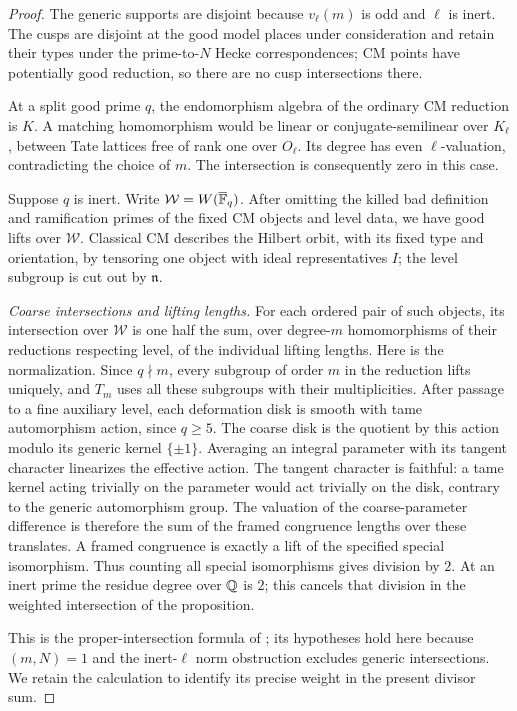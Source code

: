 \begin{proof}
The generic supports are disjoint because \(v_\ell(m)\) is odd
and \(\ell\) is inert. The cusps are disjoint at the good model
places under consideration and retain their types under the
prime-to-\(N\) Hecke correspondences; CM points have potentially
good reduction, so there are no cusp intersections there.

At a split good prime \(q\), the endomorphism algebra of the
ordinary CM reduction is \(K\). A matching homomorphism would
be linear or conjugate-semilinear over \(K_\ell\), between Tate
lattices free of rank one over \(O_\ell\). Its degree has even
\(\ell\)-valuation, contradicting the choice of \(m\).
The intersection is consequently zero in this case.

Suppose \(q\) is inert. Write
\(\mathcal W=W(\overline{\mathbb F}_q)\).
After omitting the killed bad definition and ramification
primes of the fixed CM objects and level data, we have good
lifts over \(\mathcal W\). Classical CM describes the Hilbert
orbit, with its fixed type and orientation, by tensoring one
object with ideal representatives \(I\); the level subgroup
is cut out by \(\mathfrak n\).

\emph{Coarse intersections and lifting lengths.}
For each ordered pair of such objects, its intersection over
\(\mathcal W\) is one half the sum, over degree-\(m\)
homomorphisms of their reductions respecting level, of the
individual lifting lengths. Here is the normalization.
Since \(q\nmid m\), every subgroup of order \(m\) in the
reduction lifts uniquely, and \(T_m\) uses all these subgroups
with their multiplicities. After passage to a fine auxiliary
level, each deformation disk is smooth with tame automorphism
action, since \(q\ge5\). The coarse disk is the quotient by
this action modulo its generic kernel \(\{\pm1\}\).
Averaging an integral parameter with its tangent character
linearizes the effective action. The tangent character is
faithful: a tame kernel acting trivially on the parameter
would act trivially on the disk, contrary to the generic
automorphism group. The valuation of the coarse-parameter
difference is therefore the sum of the framed congruence
lengths over these translates. A framed congruence is exactly
a lift of the specified special isomorphism. Thus counting
all special isomorphisms gives division by \(2\).
At an inert prime the residue degree over \(\mathbb Q\) is \(2\);
this cancels that division in the weighted intersection of
the proposition.

This is the proper-intersection formula of
\cite[Theorem~5.1]{Conrad03}; its hypotheses hold here because
\((m,N)=1\) and the inert-\(\ell\) norm obstruction excludes
generic intersections. We retain the calculation to identify
its precise weight in the present divisor sum.


\end{proof}
